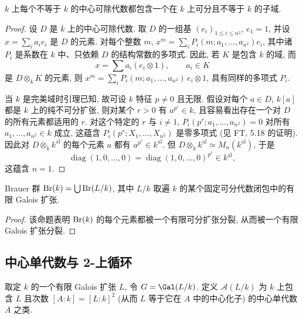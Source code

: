 \begin{lemma}\label{lem:iv.3.9}
$k$ 上每个不等于 $k$ 的中心可除代数都包含一个在 $k$ 上可分且不等于 $k$ 的子域.
\end{lemma}

\begin{proof}
设 $D$ 是 $k$ 上的中心可除代数. 取 $D$ 的一组基 $(e_i)_{1\le i\le n^2}$, $e_1=1$, 并设 $x=\sum_i a_ie_i$ 是 $D$ 的元素. 对每个整数 $m$, $x^m=\sum_i P_i(m;a_1,\ldots,a_{n^2})e_i$, 其中诸 $P_i$ 是系数在 $k$ 中、只依赖 $D$ 的结构常数的多项式. 因此, 若 $K$ 是包含 $k$ 的域, 而
\[
x=\sum a_{i}(e_{i}\otimes1),\qquad a_{i}\in K
\]
是 $D\otimes_k K$ 的元素, 则 $x^m=\sum_i P_i(m;a_1,\ldots,a_{n^2})\,e_i\otimes 1$, 具有同样的多项式 $P_i$.

当 $k$ 是完美域时引理已知, 故可设 $k$ 特征 $p\neq 0$ 且无限. 假设对每个 $a\in D$, $k[a]$ 都是 $k$ 上的纯不可分扩张, 则对某个 $r>0$ 有 $a^{p^r}\in k$, 且容易看出存在一个对 $D$ 的所有元素都适用的 $r$. 对这个特定的 $r$ 与 $i\neq 1$, $P_i(p^r;a_1,\ldots,a_{n^2})=0$ 对所有 $a_1,\ldots,a_{n^2}\in k$ 成立, 这蕴含 $P_i(p^r;X_1,\ldots,X_{n^2})$ 是零多项式 (见 FT, 5.18 的证明). 因此对 $D\otimes_k k^{\mathrm{al}}$ 的每个元素 $a$ 都有 $a^{p^r}\in k^{\mathrm{al}}$. 但 $D\otimes_k k^{\mathrm{al}}\simeq M_n(k^{\mathrm{al}})$, 于是
\[
\operatorname{diag}(1,0,\ldots,0)=\operatorname{diag}(1,0,\ldots,0)^{p^{r}}\in k^{\mathrm{al}},
\]
这蕴含 $n=1$.
\end{proof}

\begin{corollary}\label{cor:iv.3.10}
Brauer 群 $\operatorname{Br}(k)=\bigcup\operatorname{Br}(L/k)$, 其中 $L/k$ 取遍 $k$ 的某个固定可分代数闭包中的有限 Galois 扩张.
\end{corollary}

\begin{proof}
该命题表明 $\operatorname{Br}(k)$ 的每个元素都被一个有限可分扩张分裂, 从而被一个有限 Galois 扩张分裂.
\end{proof}

\subsection*{中心单代数与 2-上循环}

取定 $k$ 的一个有限 Galois 扩张 $L$, 令 $G=\Gal(L/k)$. 定义 $\mathcal{A}(L/k)$ 为 $k$ 上包含 $L$ 且次数 $[A:k]=[L:k]^2$ (从而 $L$ 等于它在 $A$ 中的中心化子) 的中心单代数 $A$ 之类.

